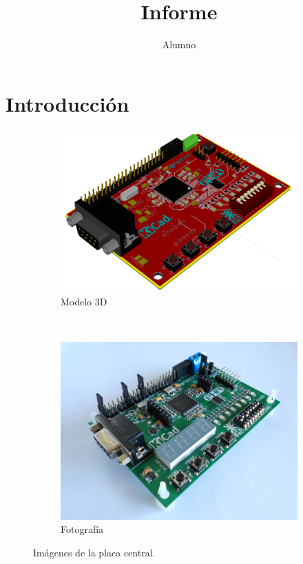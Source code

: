 \documentclass[a5paper]{report}
\title{Informe}
\author{Alumno}
\begin{document}
\maketitle
\chapter{Introducci\'on}
\kant[1-3]

\begin{figure}[h]\centering
  \begin{subfigure}[h]{\textwidth}\centering
    \includegraphics[width=.6\textwidth]
    {board-3d-mod}  
  \caption{Modelo 3D}
  \end{subfigure}\\
  \begin{subfigure}[h]{\textwidth}\centering
  \includegraphics[width=.6\textwidth]
  {board-photo}  
  \caption{Fotograf\'ia}
  \end{subfigure}
  \caption{Im\'agenes de la placa central.}
\end{figure}
\end{document}
